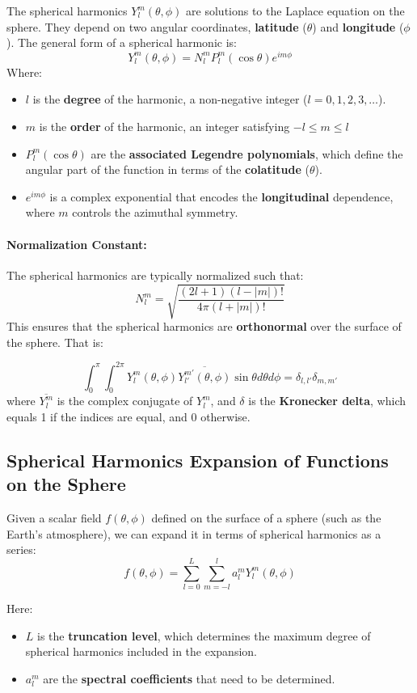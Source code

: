 The spherical harmonics $Y_l^m(\theta, \phi)$ are solutions to the Laplace equation on the sphere. They depend on two angular coordinates, \textbf{latitude} ($\theta$) and \textbf{longitude} ($\phi$).
The general form of a spherical harmonic is:
\[Y_l^m(\theta,\phi)=N_l^m P_l^m(\cos\theta)e^{im\phi}\]
Where:
\begin{itemize}
	\item $l$ is the \textbf{degree} of the harmonic, a non-negative integer ($l=0,1,2,3,…$).
	\item  $m$ is the \textbf{order} of the harmonic, an integer satisfying $-l\leq m\leq l$
	\item $P_l^m(\cos\theta)$ are the \textbf{associated Legendre polynomials}, which define the angular part of the function in terms of the \textbf{colatitude} ($\theta$).
	\item $e^{im\phi}$ is a complex exponential that encodes the \textbf{longitudinal} dependence, where $m$ controls the azimuthal symmetry.
\end{itemize}

\paragraph{\textbf{Normalization Constant}:}

The spherical harmonics are typically normalized such that:
$$N_l^m=\sqrt{\frac{(2l+1)(l-|m|)!}{4\pi(l+|m|)!}}$$
This ensures that the spherical harmonics are \textbf{orthonormal} over the surface of the sphere. That is:

$$\int_0^{\pi}\int_0^{2\pi}Y_l^m(\theta, \phi)\overline{Y_{l'}^{m'}(\theta,\phi)}\sin\theta d\theta d\phi=\delta_{l,l'}\delta_{m,m'}$$ where $\overline{Y_l^m}$
is the complex conjugate of $Y_l^m$, and $\delta$ is the \textbf{Kronecker delta}, which equals 1 if the indices are equal, and 0 otherwise.

\subsection{Spherical Harmonics Expansion of Functions on the Sphere}

Given a scalar field $f(\theta,\phi)$ defined on the surface of a sphere (such as the Earth's atmosphere), we can expand it in terms of spherical harmonics as a series:
\[f(\theta,\phi)=\displaystyle\sum_{l=0}^L\displaystyle\sum_{m=-l}^{l}a_l^mY_l^m(\theta,\phi)\]

Here:

\begin{itemize}
	\item $L$ is the \textbf{truncation level}, which determines the maximum degree of spherical harmonics included in the expansion.
	\item $a_l^m$ are the \textbf{spectral coefficients} that need to be determined.
\end{itemize}

